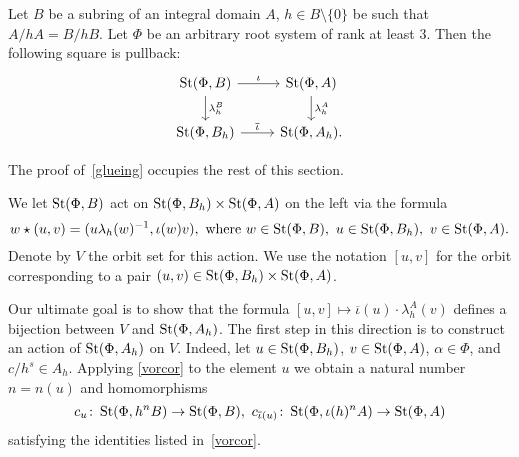 \documentclass[oneside, 11pt]{amsart} \pdfoutput=1
\begin{document}
\begin{theorem}\label{glueing}
Let $B$ be a subring of an integral domain $A$, $h\in B \setminus \{0\}$ be such that $A / hA = B / hB$. 
Let $\Phi$ be an arbitrary root system of rank at least $3$.
Then the following square is pullback:
$$\begin{tikzcd}
\St(\Phi, B) \ar{r}{\iota} \ar{d}{\lambda_h^B} & \St(\Phi, A) \ar{d}{\lambda_h^A}\\
\St(\Phi, B_h) \ar{r}{\overline{\iota}} & \St(\Phi, A_h).
\end{tikzcd}$$
\end{theorem}

The proof of~\cref{glueing} occupies the rest of this section.

We let $\mathop{\mathrm{St}}\nolimits(\Phi, B)$ act on $\mathop{\mathrm{St}}\nolimits(\Phi, B_h) \times \mathop{\mathrm{St}}\nolimits(\Phi, A)$ on the left via the formula 
\[w \star (u, v) = (u \lambda_h(w)^{-1}, \iota(w) v),\text{ where }w \in \mathop{\mathrm{St}}\nolimits(\Phi, B),\ u \in \mathop{\mathrm{St}}\nolimits(\Phi, B_h),\ v \in \mathop{\mathrm{St}}\nolimits(\Phi, A).\]
Denote by $V$ the orbit set for this action. We use the notation $[u, v]$ for the orbit corresponding to a pair $(u, v) \in \mathop{\mathrm{St}}\nolimits(\Phi, B_h) \times \mathop{\mathrm{St}}\nolimits(\Phi, A)$.

Our ultimate goal is to show that the formula $[u, v] \mapsto \overline{\iota}(u) \cdot \lambda_h^A(v)$ defines a bijection between $V$ and $\mathop{\mathrm{St}}\nolimits(\Phi, A_h)$. The first step in this direction is to construct an action of $\mathop{\mathrm{St}}\nolimits(\Phi, A_h)$ on $V$. Indeed, let $u \in \mathop{\mathrm{St}}\nolimits(\Phi, B_h)$, $v \in \mathop{\mathrm{St}}\nolimits(\Phi, A)$, $\alpha \in \Phi$, and $c/{h^s} \in A_h$.
Applying \cref{vorcor} to the element $u$ we obtain a natural number $n=n(u)$ and homomorphisms \begin{equation} \label{eq:c-homs} c_{u}\colon \St(\Phi, h^nB) \to \St(\Phi, B),\ c_{\overline{\iota}(u)}\colon \St(\Phi, \iota(h)^nA) \to \St(\Phi, A)\end{equation}
satisfying the identities listed in~\cref{vorcor}.
\end{document}
